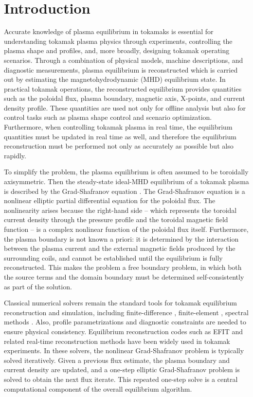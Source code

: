 \section{Introduction}\label{intro}
Accurate knowledge of plasma equilibrium in tokamaks is essential for understanding tokamak plasma physics through experiments, controlling the plasma shape and profiles, and, more broadly, designing tokamak operating scenarios.
\cite{BLUM,Lao_1985}
Through a combination of physical models, machine descriptions, 
and diagnostic measurements, plasma equilibrium is reconstructed
which is carried out by estimating the magnetohydrodynamic (MHD) equilibrium state.
In practical tokamak operations, the reconstructed equilibrium provides quantities 
such as the poloidal flux, plasma boundary, magnetic axis, X-points, and current density profile.
These quantities are used not only for offline analysis but also for control tasks 
such as plasma shape control and scenario optimization. \cite{control1,control2}
Furthermore, when controlling tokamak plasma in real time,
the equilibrium quantities must be updated in real time as well,
and therefore the equilibrium reconstruction must be performed 
not only as accurately as possible but also rapidly.

To simplify the problem, the plasma equilibrium is often assumed to be toroidally axisymmetric.
Then the steady-state ideal-MHD equilibrium of a tokamak plasma 
is described by the Grad-Shafranov equation \cite{GRAD,SHAFRANOV}. 
The Grad-Shafranov equation is a nonlinear elliptic partial differential equation
for the poloidal flux. 
The nonlinearity arises because the right-hand side -- 
which represents the toroidal current density through the pressure profile 
and the toroidal magnetic field function -- 
is a complex nonlinear function of the poloidal flux itself.
Furthermore, the plasma boundary is not known a priori: 
it is determined by the interaction between the plasma current 
and the external magnetic fields produced by the surrounding coils, 
and cannot be established until the equilibrium is fully reconstructed. 
This makes the problem a free boundary problem, in which 
both the source terms and the domain boundary must be determined 
self-consistently as part of the solution.

Classical numerical solvers remain the standard tools for tokamak equilibrium 
reconstruction and simulation, including finite-difference \cite{jeon}, 
finite-element \cite{fem}, spectral methods \cite{spectral1}.
Also, profile parametrizations and diagnostic constraints are needed 
to ensure physical consistency. \cite{jeon}
Equilibrium reconstruction codes such as EFIT \cite{Lao_1985} and related 
real-time reconstruction methods \cite{RT-EFIT,BLUM,LIUQE}
have been widely used in tokamak experiments.
In these solvers, the nonlinear Grad-Shafranov problem is typically solved iteratively.
Given a previous flux estimate, the plasma boundary and current density are updated, 
and a one-step elliptic Grad-Shafranov problem is solved to obtain the next flux iterate.
This repeated one-step solve is a central computational component of the overall equilibrium algorithm.
\cite{validation}

